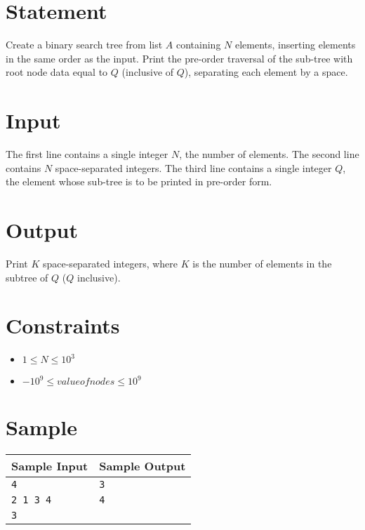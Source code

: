 \documentclass{article}
\begin{document}
\section*{Statement}

Create a binary search tree from list $A$ containing $N$ elements, inserting elements in the same order as the input. Print the pre-order traversal of the sub-tree with root node data equal to $Q$ (inclusive of $Q$), separating each element by a space.

\section*{Input}

The first line contains a single integer $N$, the number of elements. The second line contains $N$ space-separated integers. The third line contains a single integer $Q$, the element whose sub-tree is to be printed in pre-order form. 

\section*{Output}

Print $K$ space-separated integers, where $K$ is the number of elements in the subtree of $Q$ ($Q$ inclusive).

\section*{Constraints}

\begin{itemize}
    \item $1 \le N \le 10^{3}$
    \item $-10^{9} \le valueofnodes \le 10^{9}$
\end{itemize}

\section*{Sample}

\begin{tabular}{l|l}
    \hline
    \hline
    Sample Input & Sample Output \\
    \hline
    \verb+4+ & \verb+3+ \\
    \verb+2 1 3 4+ & \verb+4+ \\
    \verb+3+ & \verb++ \\
    \hline
\end{tabular}
\end{document}
